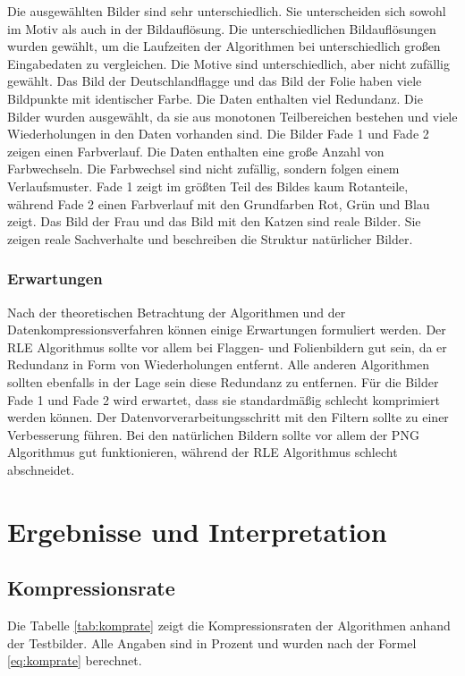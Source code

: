\documentclass[conference]{IEEEtran}
\begin{document}
Die ausgewählten Bilder sind sehr unterschiedlich. 
Sie unterscheiden sich sowohl im Motiv als auch in der Bildauflösung. 
Die unterschiedlichen Bildauflösungen wurden gewählt, um die Laufzeiten 
der Algorithmen bei unterschiedlich großen Eingabedaten zu vergleichen. 
Die Motive sind unterschiedlich, aber nicht zufällig gewählt. 
Das Bild der Deutschlandflagge und das Bild der Folie haben viele Bildpunkte 
mit identischer Farbe. Die Daten enthalten viel Redundanz. 
Die Bilder wurden ausgewählt, da sie aus monotonen Teilbereichen bestehen 
und viele Wiederholungen in den Daten vorhanden sind.
Die Bilder Fade 1 und Fade 2 zeigen einen Farbverlauf. 
Die Daten enthalten eine große Anzahl von Farbwechseln. 
Die Farbwechsel sind nicht zufällig, sondern folgen einem Verlaufsmuster. 
Fade 1 zeigt im größten Teil des Bildes kaum Rotanteile, während Fade 2 
einen Farbverlauf mit den Grundfarben Rot, Grün und Blau zeigt.
Das Bild der Frau und das Bild mit den Katzen sind reale Bilder. 
Sie zeigen reale Sachverhalte und beschreiben die Struktur natürlicher Bilder.


\subsubsection{Erwartungen}

Nach der theoretischen Betrachtung der Algorithmen und der
Datenkompressionsverfahren können einige Erwartungen formuliert werden.
Der RLE Algorithmus sollte vor allem bei Flaggen- und Folienbildern gut sein, da 
er Redundanz in Form von Wiederholungen entfernt.
Alle anderen Algorithmen sollten ebenfalls in der Lage sein diese Redundanz zu entfernen.
Für die Bilder Fade 1 und Fade 2 wird erwartet, dass sie standardmäßig 
schlecht komprimiert werden können.
Der Datenvorverarbeitungsschritt mit den Filtern sollte zu einer Verbesserung führen.
Bei den natürlichen Bildern sollte vor allem der PNG Algorithmus gut funktionieren, 
während der RLE Algorithmus schlecht abschneidet.


\section{Ergebnisse und Interpretation}

\subsection{Kompressionsrate}

Die Tabelle \ref{tab:komprate} zeigt die Kompressionsraten der Algorithmen
anhand der Testbilder.
Alle Angaben sind in Prozent und wurden nach der Formel \ref{eq:komprate} berechnet.
\end{document}
